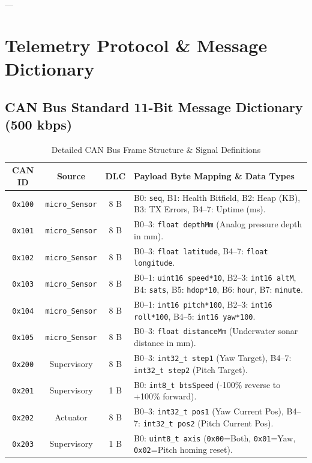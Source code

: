 \documentclass[11pt,a4paper]{article}
\begin{document}
---

\section{Telemetry Protocol \& Message Dictionary}

\subsection{CAN Bus Standard 11-Bit Message Dictionary (500 kbps)}

\begin{table}[htbp]
\centering
\caption{Detailed CAN Bus Frame Structure \& Signal Definitions}
\label{tab:can_dict_detailed}
\begin{tabularx}{\textwidth}{c c c X}
\toprule
\textbf{CAN ID} & \textbf{Source} & \textbf{DLC} & \textbf{Payload Byte Mapping \& Data Types} \\
\midrule
\texttt{0x100} & \texttt{micro\_Sensor} & 8 B & B0: \texttt{seq}, B1: Health Bitfield, B2: Heap (KB), B3: TX Errors, B4--7: Uptime (ms). \\
\texttt{0x101} & \texttt{micro\_Sensor} & 8 B & B0--3: \texttt{float depthMm} (Analog pressure depth in mm). \\
\texttt{0x102} & \texttt{micro\_Sensor} & 8 B & B0--3: \texttt{float latitude}, B4--7: \texttt{float longitude}. \\
\texttt{0x103} & \texttt{micro\_Sensor} & 8 B & B0--1: \texttt{uint16 speed*10}, B2--3: \texttt{int16 altM}, B4: \texttt{sats}, B5: \texttt{hdop*10}, B6: \texttt{hour}, B7: \texttt{minute}. \\
\texttt{0x104} & \texttt{micro\_Sensor} & 8 B & B0--1: \texttt{int16 pitch*100}, B2--3: \texttt{int16 roll*100}, B4--5: \texttt{int16 yaw*100}. \\
\texttt{0x105} & \texttt{micro\_Sensor} & 8 B & B0--3: \texttt{float distanceMm} (Underwater sonar distance in mm). \\
\texttt{0x200} & Supervisory & 8 B & B0--3: \texttt{int32\_t step1} (Yaw Target), B4--7: \texttt{int32\_t step2} (Pitch Target). \\
\texttt{0x201} & Supervisory & 1 B & B0: \texttt{int8\_t btsSpeed} (-100\% reverse to +100\% forward). \\
\texttt{0x202} & Actuator & 8 B & B0--3: \texttt{int32\_t pos1} (Yaw Current Pos), B4--7: \texttt{int32\_t pos2} (Pitch Current Pos). \\
\texttt{0x203} & Supervisory & 1 B & B0: \texttt{uint8\_t axis} (\texttt{0x00}=Both, \texttt{0x01}=Yaw, \texttt{0x02}=Pitch homing reset). \\
\bottomrule
\end{tabularx}
\end{table}
\end{document}
